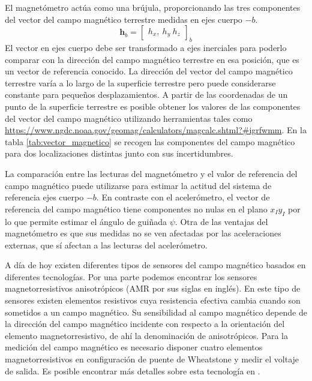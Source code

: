 \documentclass[a4paper,12pt]{book}
\begin{document}
El magnetómetro actúa como una brújula, proporcionando las tres componentes del vector del campo magnético terrestre medidas en ejes cuerpo $-b$.
\begin{equation}
    \mathbf{h}_b = \begin{bmatrix} h_x,\>h_y\>h_z    \end{bmatrix}_b
\end{equation}
El vector en ejes cuerpo debe ser transformado a ejes inerciales para poderlo comparar con la dirección del campo magnético terrestre en esa posición, que es un vector de referencia conocido. La dirección del vector del campo magnético terrestre varía a lo largo de la superficie terrestre pero puede considerarse constante para pequeños desplazamientos. A partir de las coordenadas de un punto de la superficie terrestre es posible obtener los valores de las componentes del vector del campo magnético utilizando herramientas tales como  \url{https://www.ngdc.noaa.gov/geomag/calculators/magcalc.shtml?#igrfwmm}. En la tabla \ref{tab:vector_magnetico} se recogen las componentes del campo magnético para dos localizaciones distintas junto con sus incertidumbres.

La comparación entre las lecturas del magnetómetro y el valor de referencia del campo magnético puede utilizarse para estimar la actitud del sistema de referencia ejes cuerpo $-b$. En contraste con el acelerómetro, el vector de referencia del campo magnético tiene componentes no nulas en el plano $x_Iy_I$ por lo que permite estimar el ángulo de guiñada $\psi$. Otra de las ventajas del magnetómetro es que sus medidas no se ven afectadas por las aceleraciones externas, que sí afectan a las lecturas del acelerómetro.

A día de hoy existen diferentes tipos de sensores del campo magnético basados en diferentes tecnologías. Por una parte podemos encontrar los sensores magnetorresistivos anisotrópicos (AMR por sus siglas en inglés). En este tipo de sensores existen elementos resistivos cuya resistencia efectiva cambia cuando son sometidos a un campo magnético. Su sensibilidad al campo magnético depende de la dirección del campo magnético incidente con respecto a la orientación del elemento magnetorresistivo, de ahí la denominación de anisotrópicos. Para la medición del campo magnético es necesario disponer cuatro elementos magnetorresistivos en configuración de puente de Wheatstone y medir el voltaje de salida. Es posible encontrar más detalles sobre esta tecnología en \cite{renaudin2010complete, freitas2007magnetoresistive}.
\end{document}
